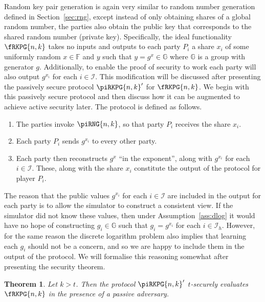 \documentclass{article}
\newtheorem{theorem}{Theorem}
\theoremstyle{remark}
\newcommand{\F}{\mathbb{F}}
\newcommand{\G}{\mathbb{G}}
\begin{document}
Random key pair generation is again very similar to random number generation
defined in Section~\ref{sec:rng}, except instead of only obtaining shares of a
global random number, the parties also obtain the public key that corresponds
to the shared random number (private key). Specifically, the ideal
functionality $\fRKPG{n,k}$ takes no inputs and outputs to each party $P_i$ a
share $x_i$ of some uniformly random $x \in \F$ and $y$ such that $y = g^x \in
\G$ where $\G$ is a group with generator $g$.  Additionally, to enable the
proof of security to work each party will also output $g^{x_i}$ for each $i \in
\mathcal{I}$. This modification will be discussed after presenting the
passively secure protocol ${\piRKPG{n,k}}'$ for $\fRKPG{n,k}$. We begin with
this passively secure protocol and then discuss how it can be augmented to
achieve active security later. The protocol is defined as follows.

\begin{enumerate}
	\item The parties invoke $\piRNG{n,k}$, so that party $P_i$ receives the
		share $x_i$.

	\item\label{enum:rkpgPassBC} Each party $P_i$ sends $g^{x_i}$ to every
		other party.

	\item Each party then reconstructs $g^x$ ``in the exponent'', along with
		$g^{x_i}$ for each $i \in \mathcal{I}$. These, along with the share
		$x_i$ constitute the output of the protocol for player $P_i$.
\end{enumerate}

The reason that the public values $g^{x_i}$ for each $i \in \mathcal{I}$ are
included in the output for each party is to allow the simulator to construct a
consistent view. If the simulator did not know these values, then under
Assumption~\ref{ass:dlog} it would have no hope of constructing $g_i \in \G$
such that $g_i = g^{x_i}$ for each $i \in \mathcal{I}_h$. However, for the same
reason the discrete logarithm problem also implies that learning each $g_i$
should not be a concern, and so we are happy to include them in the output of
the protocol. We will formalise this reasoning somewhat after presenting the
security theorem.

\begin{theorem}\label{thm:rkpg}
	Let $k > t$. Then the protocol ${\piRKPG{n,k}}'$ $t$-securely evaluates
	$\fRKPG{n,k}$ in the presence of a passive adversary.
\end{theorem}
\end{document}
